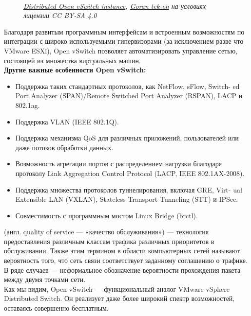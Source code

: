 \documentclass[14pt, a4paper]{article}
\begin{document}
\begin{figure}[h]
    \centering
     \\
    \small\textit{\href{https://commons.wikimedia.org/wiki/File:Distributed_Open_vSwitch_instance.svg}{Distributed Open vSwitch instance}, \href{https://commons.wikimedia.org/wiki/User:Goran_tek-en}{Goran tek-en} на условиях лицензии CC BY-SA 4.0} 
    \label{framework} 
\end{figure}

Благодаря развитым программным интерфейсам и встроенным возможностям по интеграции с
широко используемыми гипервизорами (за исключением разве что VMware ESXi), Open vSwitch
позволяет автоматизировать управление сетью, состоящей из множества виртуальных машин.\\

\textbf{Другие важные особенности Open vSwitch:}
\begin{itemize}
    \item Поддержка таких стандартных протоколов, как NetFlow, sFlow, Switch- ed Port Analyzer
    (SPAN)/Remote Switched Port Analyzer (RSPAN), LACP и 802.1ag.
    \item Поддержка VLAN (IEEE 802.1Q).
    \item Поддержка механизма QoS для различных приложений, пользователей или даже потоков
    обработки данных.
    \item Возможность агрегации портов с распределением нагрузки благодаря протоколу Link
    Aggregation Control Protocol (LACP, IEEE 802.1AX-2008).
    \item Поддержка множества протоколов туннелирования, включая GRE, Virt- ual Extensible LAN
    (VXLAN), Stateless Transport Tunneling (STT) и IPSec.
    \item Совместимость с программным мостом Linux Bridge (brctl).
\end{itemize}

\href{https://ru.wikipedia.org/wiki/QoS}{} (англ. quality of service — «качество обслуживания») — технология предоставления различным
классам трафика различных приоритетов в обслуживании. Также этим термином в области
компьютерных сетей называют вероятность того, что сеть связи соответствует заданному соглашению
о трафике. В ряде случаев — неформальное обозначение вероятности прохождения пакета между
двумя точками сети.\\

Как мы видим, Open vSwitch — функциональный аналог VMware vSphere Distributed Switch. Он
реализует даже более широкий спектр возможностей, оставаясь совершенно бесплатным.\\
\end{document}
